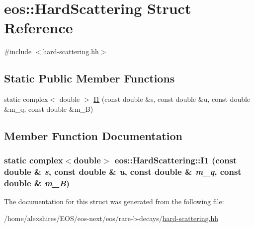 \hypertarget{structeos_1_1HardScattering}{
\section{eos::HardScattering Struct Reference}
\label{structeos_1_1HardScattering}
}


{\ttfamily \#include $<$hard-\/scattering.hh$>$}\subsection*{Static Public Member Functions}
\begin{DoxyCompactItemize}
\item 
static complex$<$ double $>$ \hyperlink{structeos_1_1HardScattering_aec0f5bdc61bef7628ed68910f9d32ca2}{I1} (const double \&s, const double \&u, const double \&m\_\-q, const double \&m\_\-B)
\end{DoxyCompactItemize}


\subsection{Member Function Documentation}
\hypertarget{structeos_1_1HardScattering_aec0f5bdc61bef7628ed68910f9d32ca2}{
\subsubsection[{I1}]{\setlength{\rightskip}{0pt plus 5cm}static complex$<$double$>$ eos::HardScattering::I1 (const double \& {\em s}, \/  const double \& {\em u}, \/  const double \& {\em m\_\-q}, \/  const double \& {\em m\_\-B})}}
\label{structeos_1_1HardScattering_aec0f5bdc61bef7628ed68910f9d32ca2}


The documentation for this struct was generated from the following file:\begin{DoxyCompactItemize}
\item 
/home/alexshires/EOS/eos-\/next/eos/rare-\/b-\/decays/\hyperlink{hard-scattering_8hh}{hard-\/scattering.hh}\end{DoxyCompactItemize}
